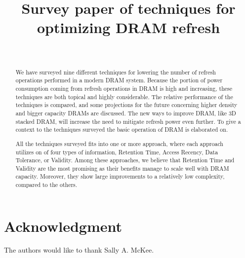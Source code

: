 \documentclass[journal, a4paper]{IEEEtran}
\begin{document}
\title{Survey paper of techniques for optimizing DRAM refresh}

\author{\\
}

\maketitle


\begin{abstract}
We have surveyed nine different techniques for lowering the number of refresh operations performed in a modern DRAM system. Because the portion of power consumption coming from refresh operations in DRAM is high and increasing, these techniques are both topical and highly considerable. The relative performance of the techniques is compared, and some projections for the future concerning higher density and bigger capacity DRAMs are discussed. The new ways to improve DRAM, like 3D stacked DRAM, will increase the need to mitigate refresh power even further. To give a context to the techniques surveyed the basic operation of DRAM is elaborated on. 

All the techniques surveyed fits into one or more approach, where each approach utilizes on of four types of information, Retention Time, Access Recency, Data Tolerance, or Validity. Among these approaches, we believe that Retention Time and Validity are the most promising as their benefits manage to scale well with DRAM capacity. Moreover, they show large improvements to a relatively low complexity, compared to the others.
\end{abstract}







\section*{Acknowledgment}
The authors would like to thank Sally A. McKee.



\IEEEtriggercmd{\newpage}




\end{document}
